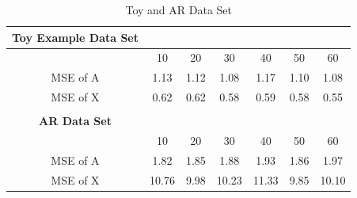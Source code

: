 \begin{table}[H]
\centering
\begin{tabular}{|c|c|c|c|c|c|c|}
\hline 
\textbf{Toy Example Data Set} & & & & & & \\ \hline
 & 10 & 20 & 30 & 40 & 50 & 60 \\ 
\hline 
MSE of A & 1.13 & 1.12 & 1.08 & 1.17 & 1.10 & 1.08 \\ 
\hline 
MSE of X & 0.62 & 0.62 & 0.58 & 0.59 & 0.58 & 0.55 \\ 
\hline
\\ \hline
\textbf{AR Data Set} & & & & & & \\ \hline
 & 10 & 20 & 30 & 40 & 50 & 60 \\ 
\hline 
MSE of A & 1.82 & 1.85 & 1.88 & 1.93 & 1.86 & 1.97 \\ 
\hline 
MSE of X & 10.76 & 9.98 & 10.23 & 11.33 & 9.85 & 10.10 \\ 
\hline
\end{tabular} 
\caption{Toy and AR Data Set}
\end{table}

